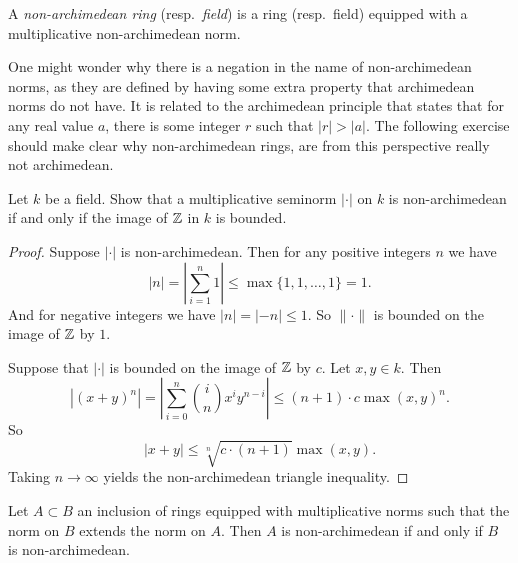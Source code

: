 \begin{definition}
	A \emph{non-archimedean ring} (resp.\ \emph{field}) is a ring (resp.\ field) equipped with a multiplicative non-archimedean norm. 
\end{definition}

One might wonder why there is a negation in the name of non-archimedean norms, as they are defined by having some extra property that archimedean norms do not have. 
It is related to the archimedean principle that states that for any real value $a$, there is some integer $r$ such that $|r| > |a|$. 
The following exercise should make clear why non-archimedean rings, are from this perspective really not archimedean.
\begin{exercise}
	Let $k$ be a field.
	Show that a multiplicative seminorm $|\cdot |$ on $k$ is non-archimedean if and only if the image of $\mathbb{Z}$ in $k$ is bounded. 
\end{exercise}
\begin{proof}
	Suppose $|\cdot |$ is non-archimedean. Then for any positive integers $n$ we have \[
	|n| = \left|\sum_{i = 1}^{n} 1 \right| \le \max \{1, 1, \ldots, 1\}  = 1
	.\] 
	And for negative integers we have $|n| = |-n| \le 1$. So $\|\cdot \|$ is bounded on the image of $\mathbb{Z}$ by $1$. 


	Suppose that $|\cdot |$ is bounded on the image of $\mathbb{Z}$ by $c$. 
	Let $x, y \in k$. Then \[
		|(x + y)^{n}| = \left| \sum_{i = 0}^{n} \binom{i}{n} x ^{i} y ^{n-i}\right| \le (n + 1)\cdot c \max(x, y)^{n}
	.\] 
	So \[
		|x + y| \le \sqrt[n]{c\cdot (n + 1)}  \max(x, y)
	.\] 
	Taking $n \to \infty$ yields the non-archimedean triangle inequality. 
\end{proof}

\begin{corollary}
	Let $A \subset  B$ an inclusion of rings  equipped with multiplicative norms such that the norm on $B$ extends the norm on $A$. 
	Then $A$ is non-archimedean if and only if $B$ is non-archimedean. 
\end{corollary}

